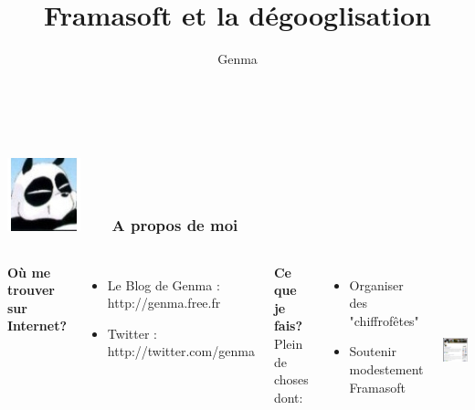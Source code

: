 \documentclass{beamer}
\title[Framasoft et la dégooglisation]{Framasoft et la dégooglisation}
\author{Genma}
\begin{document}
\begin{frame}
	\titlepage
	\vfill
	\begin{center}
		\\[2.5ex]
		{\tiny\CcNote{\CcLongnameByNcSa}}
		\vspace*{-2.5ex}
	\end{center}
\end{frame}



\begin{frame}
\frametitle{\includegraphics[scale=0.4]{./images/Genma.jpg} \ \ \  A propos de moi  }
\begin{columns}[c] 

\textbf{Où me trouver sur Internet?}
\begin{itemize}
\item Le Blog de Genma : http://genma.free.fr
\item Twitter : http://twitter.com/genma
\end{itemize}

\textbf{Ce que je fais?}
\\ Plein de choses dont:
\begin{itemize}
\item Organiser des "chiffrofêtes"
\item Soutenir modestement Framasoft
\end{itemize}

\includegraphics[width=5cm,height=5cm]{./images/blog.png} 
\end{columns}
\end{frame}
\end{document}
